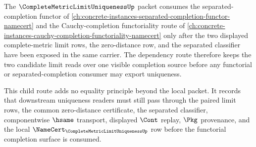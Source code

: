 The $\CompleteMetricLimitUniquenessUp$ packet consumes the separated-completion functor of \autoref{ch:concrete-instances-separated-completion-functor-namecert} and the Cauchy-completion functoriality route of \autoref{ch:concrete-instances-cauchy-completion-functoriality-namecert} only after the two displayed complete-metric limit rows, the zero-distance row, and the separated classifier have been exposed in the same carrier. The dependency route therefore keeps the two candidate limit reads over one visible completion source before any functorial or separated-completion consumer may export uniqueness.

This child route adds no equality principle beyond the local packet. It records that downstream uniqueness readers must still pass through the paired limit rows, the common zero-distance certificate, the separated classifier, componentwise $\hsame$ transport, displayed $\Cont$ replay, $\Pkg$ provenance, and the local $\NameCert_{\CompleteMetricLimitUniquenessUp}$ row before the functorial completion surface is consumed.
